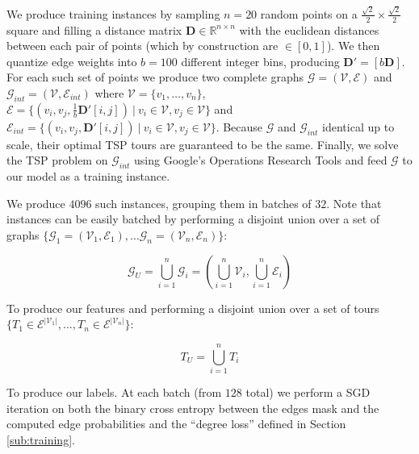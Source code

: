 \documentclass{article}
\begin{document}
We produce training instances by sampling $n=20$ random points on a $\frac{\sqrt{2}}{2} \times \frac{\sqrt{2}}{2}$ square and filling a distance matrix $\mathbf{D} \in \mathbb{R}^{n \times n}$ with the euclidean distances between each pair of points (which by construction are $\in [0,1]$). We then quantize edge weights into $b=100$ different integer bins, producing $\mathbf{D}' = [b\mathbf{D}]$. For each such set of points we produce two complete graphs $\mathcal{G} = (\mathcal{V},\mathcal{E})$ and $\mathcal{G}_{int} = (\mathcal{V},\mathcal{E}_{int})$ where $\mathcal{V} = \{v_1, \dots, v_n\}$, $\mathcal{E} = \{(v_i,v_j,\frac{1}{b}\mathbf{D}'[i,j]) ~|~ v_i \in \mathcal{V}, v_j \in \mathcal{V}\}$ and $\mathcal{E}_{int} = \{(v_i,v_j,\mathbf{D}'[i,j]) ~|~ v_i \in \mathcal{V}, v_j \in \mathcal{V}\}$. Because $\mathcal{G}$ and $\mathcal{G}_{int}$ identical up to scale, their optimal TSP tours are guaranteed to be the same. Finally, we solve the TSP problem on $\mathcal{G}_{int}$ using Google's Operations Research Tools \cite{or-tools-user-manual} and feed $\mathcal{G}$ to our model as a training instance.

We produce $4096$ such instances, grouping them in batches of $32$. Note that instances can be easily batched by performing a disjoint union over a set of graphs $\{\mathcal{G}_{1} = (\mathcal{V}_1,\mathcal{E}_1), \dots \mathcal{G}_{n} = (\mathcal{V}_n,\mathcal{E}_n)\}$: 

\begin{equation}
\mathcal{G}_U = \bigcup_{i=1}^{n}{\mathcal{G}_i} = \left(\bigcup_{i=1}^{n}{\mathcal{V}_i}, \bigcup_{i=1}^{n}{\mathcal{E}_i}\right)
\end{equation}

To produce our features and performing a disjoint union over a set of tours \\ $\{ T_1 \in \mathcal{E}^{|\mathcal{V}_1|}, \dots, T_n \in \mathcal{E}^{|\mathcal{V}_n|} \}$:

\begin{equation}
T_U = \bigcup_{i=1}^{n}{T_i}
\end{equation}

To produce our labels. At each batch (from $128$ total) we perform a SGD iteration on both the binary cross entropy between the edges mask and the computed edge probabilities and the ``degree loss'' defined in Section \ref{sub:training}.
\end{document}
